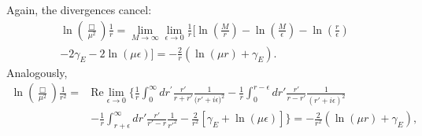 \documentclass[10pt,a4paper]{article}
\begin{document}
Again, the divergences cancel:
\begin{equation}
\begin{gathered}
\ln\left(\frac{\Box}{\mu^2}\right)\frac{1}{r}=\lim_{M\to\infty}\lim_{\epsilon\to0}\frac{1}{r}\bigg[\ln\left(\frac{M}{r}\right)-\ln\left(\frac{M}{\epsilon}\right)-\ln\left(\frac{r}{\epsilon}\right)\\
-2\gamma_E-2\ln(\mu\epsilon)\bigg]=-\frac{2}{r}\left(\ln(\mu r)+\gamma_E\right).
\end{gathered}
\end{equation}
Analogously,
\begin{equation}
\begin{split}
    \ln\left(\frac{\Box}{\mu^2}\right)\frac{1}{r^2}=&\text{Re}\lim_{\epsilon\to0}\bigg\{\frac{1}{r}\int_0^\infty dr^{'}\frac{r'}{r+r'}\frac{1}{{(r'+i\epsilon})^2}-\frac{1}{r}\int_0^{r-\epsilon}dr'\frac{r'}{r-r'}\frac{1}{{(r'+i\epsilon)}^2}\\
    &-\frac{1}{r}\int_{r+\epsilon}^\infty dr'\frac{r'}{r'-r}\frac{1}{{r'}^2}-\frac{2}{r^2}\left[\gamma_E+\ln\left(\mu\epsilon\right)\right]\bigg\}=-\frac{2}{r^2}\left(\ln\left(\mu r\right)+\gamma_E\right),
\end{split}
\end{equation}


\end{document}
